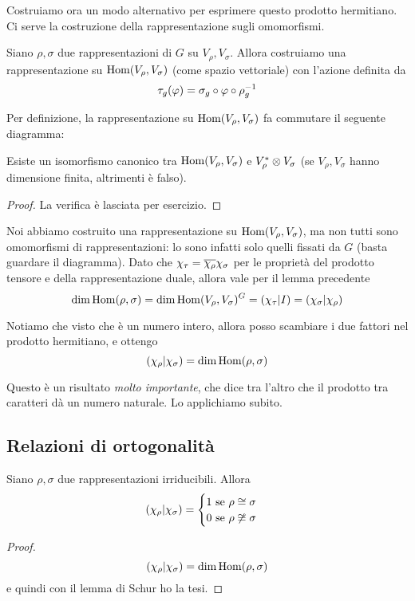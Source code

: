 Costruiamo ora un modo alternativo per esprimere questo prodotto hermitiano. Ci serve la costruzione della rappresentazione sugli omomorfismi.

\begin{mydef}\label{def:HomRepr}
  Siano $\rho, \sigma$ due rappresentazioni di $G$ su $V_\rho,V_\sigma$. Allora costruiamo una rappresentazione su $\operatorname{Hom}(V_\rho,V_\sigma)$ (come spazio vettoriale) con l'azione definita da 
  \[
  \tau_g (\varphi) = \sigma_g \circ \varphi \circ \rho_g^{-1}
  \]
\end{mydef}

Per definizione, la rappresentazione su $\operatorname{Hom}(V_\rho,V_\sigma)$ fa commutare il seguente diagramma:
  

\begin{myprop}
  Esiste un isomorfismo canonico tra $\operatorname{Hom} (V_\rho,V_\sigma)$ e $V_\rho^* \otimes V_\sigma$ (se $V_\rho, V_\sigma$ hanno dimensione finita, altrimenti è falso).
\end{myprop}

\begin{proof}
  La verifica è lasciata per esercizio.
\end{proof}

Noi abbiamo costruito una rappresentazione su $\operatorname{Hom}(V_\rho,V_\sigma)$, ma non tutti sono omomorfismi di rappresentazioni: lo sono infatti solo quelli fissati da $G$ (basta guardare il diagramma). Dato che $\chi_\tau = \overline{\chi_\rho}\chi_\sigma$ per le proprietà del prodotto tensore e della rappresentazione duale, allora vale per il lemma precedente
\[
  \dim \operatorname{Hom}(\rho,\sigma) = \dim \operatorname{Hom}(V_\rho,V_\sigma)^G = \left(\chi_\tau | I\right) = \left(\chi_\sigma | \chi_\rho\right)
\]

Notiamo che visto che è un numero intero, allora posso scambiare i due fattori nel prodotto hermitiano, e ottengo
\[
  \left(\chi_\rho | \chi_\sigma\right) = \dim \operatorname{Hom}(\rho,\sigma)
\]

Questo è un risultato \emph{molto importante}, che dice tra l'altro che il prodotto tra caratteri dà un numero naturale. Lo applichiamo subito.





\subsection{Relazioni di ortogonalità}
\begin{mytheorem}
  Siano $\rho,\sigma$ due rappresentazioni irriducibili. Allora
  \[
  \left(\chi_\rho | \chi_\sigma\right) = \begin{cases}
			1 \mbox{ se } \rho \cong \sigma \\
			0 \mbox{ se } \rho \not\cong \sigma
		      \end{cases}
  \]
\end{mytheorem}
\begin{proof}
  \[
  \left(\chi_\rho | \chi_\sigma\right)=\dim \operatorname{Hom}(\rho,\sigma)
  \]
  e quindi con il lemma di Schur ho la tesi.
\end{proof}

